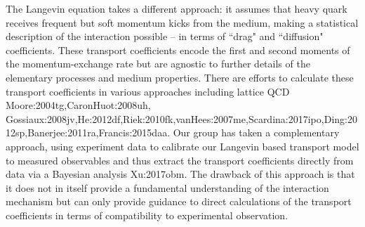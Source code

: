 The Langevin equation takes a different approach: 
it assumes that heavy quark receives frequent but soft momentum kicks from the medium, making a statistical description of the interaction possible -- in terms of ``drag" and ``diffusion" coefficients.
These transport coefficients encode the first and second moments of the momentum-exchange rate but are agnostic to further details of the elementary processes and medium properties.
There are efforts to calculate these transport coefficients in various approaches including lattice QCD {Moore:2004tg,CaronHuot:2008uh, Gossiaux:2008jv,He:2012df,Riek:2010fk,vanHees:2007me,Scardina:2017ipo,Ding:2012sp,Banerjee:2011ra,Francis:2015daa}. Our group has taken a complementary approach, using experiment data to calibrate our Langevin based transport model to measured observables and thus extract the transport coefficients directly from data via a Bayesian analysis {Xu:2017obm}. The drawback of this approach is that it does not in itself provide a fundamental understanding of the interaction mechanism but can only provide guidance to direct calculations of the transport coefficients in terms of compatibility to experimental observation.

